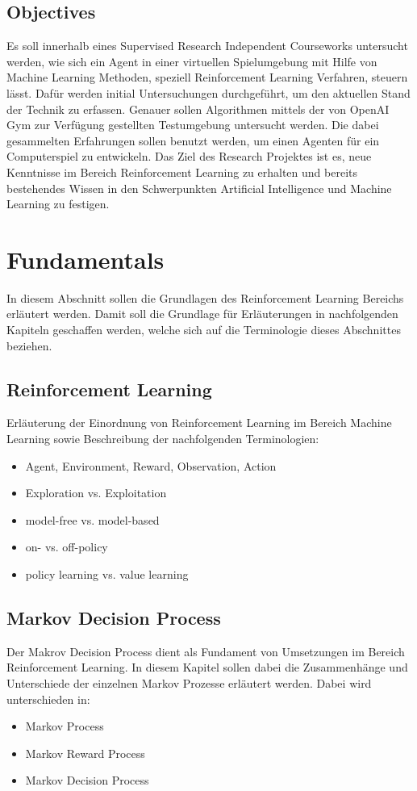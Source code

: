 \documentclass[11pt]{scrartcl}
\begin{document}
\subsection{Objectives}
Es soll innerhalb eines Supervised Research Independent Courseworks untersucht werden, wie sich ein Agent in einer virtuellen Spielumgebung mit Hilfe von Machine Learning Methoden, speziell Reinforcement Learning Verfahren, steuern lässt. Dafür werden initial Untersuchungen durchgeführt, um den aktuellen Stand der Technik zu erfassen. Genauer sollen Algorithmen mittels der von OpenAI Gym zur Verfügung gestellten Testumgebung untersucht werden. Die dabei gesammelten Erfahrungen sollen benutzt werden, um einen Agenten für ein Computerspiel zu entwickeln. Das Ziel des Research Projektes ist es, neue Kenntnisse im Bereich Reinforcement Learning zu erhalten und bereits bestehendes Wissen in den Schwerpunkten Artificial Intelligence und Machine Learning zu festigen.

\section{Fundamentals}
In diesem Abschnitt sollen die Grundlagen des Reinforcement Learning Bereichs erläutert werden. Damit soll die Grundlage für Erläuterungen in nachfolgenden Kapiteln geschaffen werden, welche sich auf die Terminologie dieses Abschnittes beziehen.
\subsection{Reinforcement Learning}
Erläuterung der Einordnung von Reinforcement Learning im Bereich Machine Learning sowie Beschreibung der nachfolgenden Terminologien:
\begin{itemize}
\itemsep0pt
\item Agent, Environment, Reward, Observation, Action
\item Exploration vs. Exploitation
\item model-free vs. model-based
\item on- vs. off-policy
\item policy learning vs. value learning
\end{itemize}
\subsection{Markov Decision Process}
Der Makrov Decision Process dient als Fundament von Umsetzungen im Bereich Reinforcement Learning. In diesem Kapitel sollen dabei die Zusammenhänge und Unterschiede der einzelnen Markov Prozesse erläutert werden. Dabei wird unterschieden in:
\begin{itemize}
\itemsep0pt
\item Markov Process
\item Markov Reward Process
\item Markov Decision Process 
\end{itemize}
\end{document}
